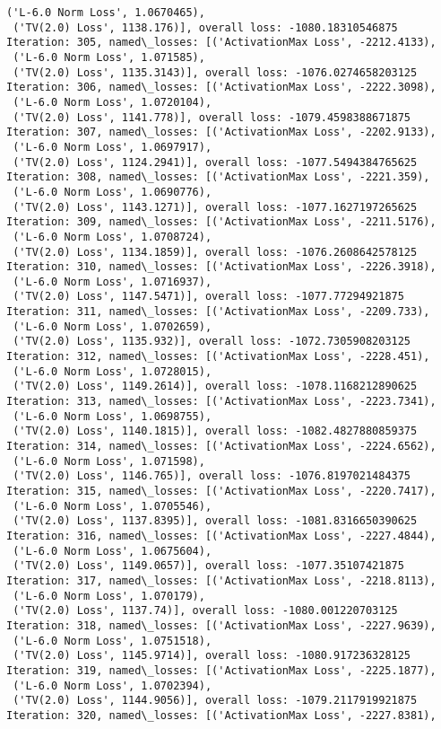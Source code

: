 \documentclass[10pt]{article}
\begin{document}
\begin{Verbatim}[commandchars=\\\{\}]
 ('L-6.0 Norm Loss', 1.0670465),
 ('TV(2.0) Loss', 1138.176)], overall loss: -1080.18310546875
Iteration: 305, named\_losses: [('ActivationMax Loss', -2212.4133),
 ('L-6.0 Norm Loss', 1.071585),
 ('TV(2.0) Loss', 1135.3143)], overall loss: -1076.0274658203125
Iteration: 306, named\_losses: [('ActivationMax Loss', -2222.3098),
 ('L-6.0 Norm Loss', 1.0720104),
 ('TV(2.0) Loss', 1141.778)], overall loss: -1079.4598388671875
Iteration: 307, named\_losses: [('ActivationMax Loss', -2202.9133),
 ('L-6.0 Norm Loss', 1.0697917),
 ('TV(2.0) Loss', 1124.2941)], overall loss: -1077.5494384765625
Iteration: 308, named\_losses: [('ActivationMax Loss', -2221.359),
 ('L-6.0 Norm Loss', 1.0690776),
 ('TV(2.0) Loss', 1143.1271)], overall loss: -1077.1627197265625
Iteration: 309, named\_losses: [('ActivationMax Loss', -2211.5176),
 ('L-6.0 Norm Loss', 1.0708724),
 ('TV(2.0) Loss', 1134.1859)], overall loss: -1076.2608642578125
Iteration: 310, named\_losses: [('ActivationMax Loss', -2226.3918),
 ('L-6.0 Norm Loss', 1.0716937),
 ('TV(2.0) Loss', 1147.5471)], overall loss: -1077.77294921875
Iteration: 311, named\_losses: [('ActivationMax Loss', -2209.733),
 ('L-6.0 Norm Loss', 1.0702659),
 ('TV(2.0) Loss', 1135.932)], overall loss: -1072.7305908203125
Iteration: 312, named\_losses: [('ActivationMax Loss', -2228.451),
 ('L-6.0 Norm Loss', 1.0728015),
 ('TV(2.0) Loss', 1149.2614)], overall loss: -1078.1168212890625
Iteration: 313, named\_losses: [('ActivationMax Loss', -2223.7341),
 ('L-6.0 Norm Loss', 1.0698755),
 ('TV(2.0) Loss', 1140.1815)], overall loss: -1082.4827880859375
Iteration: 314, named\_losses: [('ActivationMax Loss', -2224.6562),
 ('L-6.0 Norm Loss', 1.071598),
 ('TV(2.0) Loss', 1146.765)], overall loss: -1076.8197021484375
Iteration: 315, named\_losses: [('ActivationMax Loss', -2220.7417),
 ('L-6.0 Norm Loss', 1.0705546),
 ('TV(2.0) Loss', 1137.8395)], overall loss: -1081.8316650390625
Iteration: 316, named\_losses: [('ActivationMax Loss', -2227.4844),
 ('L-6.0 Norm Loss', 1.0675604),
 ('TV(2.0) Loss', 1149.0657)], overall loss: -1077.35107421875
Iteration: 317, named\_losses: [('ActivationMax Loss', -2218.8113),
 ('L-6.0 Norm Loss', 1.070179),
 ('TV(2.0) Loss', 1137.74)], overall loss: -1080.001220703125
Iteration: 318, named\_losses: [('ActivationMax Loss', -2227.9639),
 ('L-6.0 Norm Loss', 1.0751518),
 ('TV(2.0) Loss', 1145.9714)], overall loss: -1080.917236328125
Iteration: 319, named\_losses: [('ActivationMax Loss', -2225.1877),
 ('L-6.0 Norm Loss', 1.0702394),
 ('TV(2.0) Loss', 1144.9056)], overall loss: -1079.2117919921875
Iteration: 320, named\_losses: [('ActivationMax Loss', -2227.8381),

\end{Verbatim}
\end{document}
